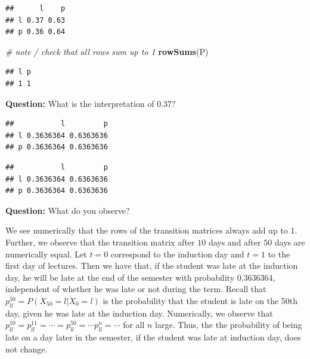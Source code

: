 \documentclass[]{article}
\newenvironment{Shaded}{\begin{snugshade}}{\end{snugshade}}
\newcommand{\CommentTok}[1]{\textcolor[rgb]{0.56,0.35,0.01}{\textit{#1}}}
\newcommand{\DecValTok}[1]{\textcolor[rgb]{0.00,0.00,0.81}{#1}}
\newcommand{\KeywordTok}[1]{\textcolor[rgb]{0.13,0.29,0.53}{\textbf{#1}}}
\newcommand{\NormalTok}[1]{#1}
\newcommand{\OperatorTok}[1]{\textcolor[rgb]{0.81,0.36,0.00}{\textbf{#1}}}
\newcommand{\StringTok}[1]{\textcolor[rgb]{0.31,0.60,0.02}{#1}}
\begin{document}
\begin{verbatim}
##      l    p
## l 0.37 0.63
## p 0.36 0.64
\end{verbatim}

\begin{Shaded}
\begin{Highlighting}[]
\CommentTok{# note / check that all rows sum up to 1}
\KeywordTok{rowSums}\NormalTok{(P)}
\end{Highlighting}
\end{Shaded}

\begin{verbatim}
## l p 
## 1 1
\end{verbatim}

\textbf{Question:} What is the interpretation of 0.37?

\begin{Shaded}
\end{Shaded}

\begin{verbatim}
##           l         p
## l 0.3636364 0.6363636
## p 0.3636364 0.6363636
\end{verbatim}

\begin{Shaded}
\end{Shaded}

\begin{verbatim}
##           l         p
## l 0.3636364 0.6363636
## p 0.3636364 0.6363636
\end{verbatim}

\textbf{Question:} What do you observe?

We see numerically that the rows of the transition matrices always add
up to 1. Further, we observe that the transition matrix after \(10\)
days and after \(50\) days are numerically equal. Let \(t= 0\)
correspond to the induction day and \(t = 1\) to the first day of
lectures. Then we have that, if the student was late at the induction
day, he will be late at the end of the semester with probability
0.3636364, independent of whether he was late or not during the term.
Recall that \(p_{ll}^{50} = P(X_{50} = l | X_0 = l)\) is the probability
that the student is late on the 50th day, given he was late at the
induction day. Numerically, we observe that
\(p_{ll}^{10} = p_{ll}^{11} = \cdots = p_{ll}^{50} = \cdots p_{ll}^{n} = \cdots\)
for all \(n\) large. Thus, the the probability of being late on a day
later in the semester, if the student was late at induction day, does
not change.
\end{document}
